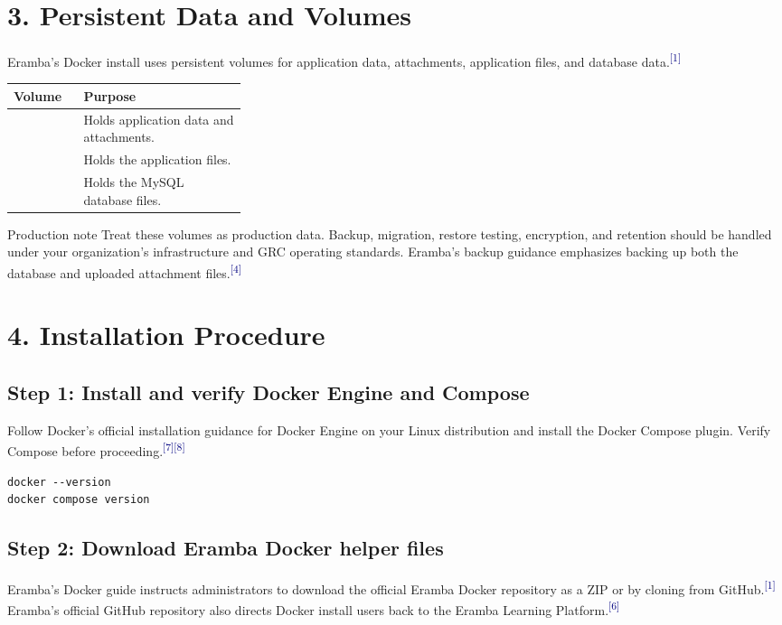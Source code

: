 \documentclass[10pt,letterpaper]{article}
\newcommand{\source}[1]{\textsuperscript{\textcolor{navy}{#1}}}
\begin{document}
\section{3. Persistent Data and Volumes}
Eramba's Docker install uses persistent volumes for application data, attachments, application files, and database data.\source{[1]}

\begin{center}
\begin{tabularx}{\linewidth}{L{0.30\linewidth}Y}
\toprule
\textbf{Volume} & \textbf{Purpose} \\
\midrule
{} & Holds application data and attachments. \\
 & Holds the application files. \\
 & Holds the MySQL database files. \\
\bottomrule
\end{tabularx}
\end{center}

\begin{warningbox}{Production note}
Treat these volumes as production data. Backup, migration, restore testing, encryption, and retention should be handled under your organization's infrastructure and GRC operating standards. Eramba's backup guidance emphasizes backing up both the database and uploaded attachment files.\source{[4]}
\end{warningbox}

\section{4. Installation Procedure}
\subsection{Step 1: Install and verify Docker Engine and Compose}
Follow Docker's official installation guidance for Docker Engine on your Linux distribution and install the Docker Compose plugin. Verify Compose before proceeding.\source{[7]}\source{[8]}

\begin{verbatim}
docker --version
docker compose version
\end{verbatim}

\subsection{Step 2: Download Eramba Docker helper files}
Eramba's Docker guide instructs administrators to download the official Eramba Docker repository as a ZIP or by cloning from GitHub.\source{[1]} Eramba's official GitHub repository also directs Docker install users back to the Eramba Learning Platform.\source{[6]}
\end{document}

